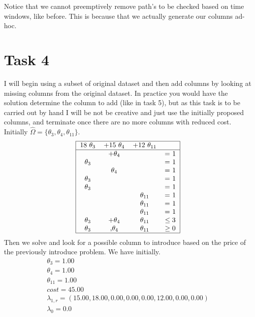 \documentclass{article}
\begin{document}
    Notice that we cannot preemptively remove path's to be checked based on time windows, like before.
    This is because that we actually generate our columns ad-hoc.

    \section{Task 4}
    I will begin using a subset of original dataset and then add columns by looking at missing columns from the original dataset.
    In practice you would have the solution determine the column to add (like in task 5), but as this task is to be carried out by hand I will be not be creative and just use the initially proposed columns, and terminate once there are no more columns with reduced cost.
    Initially $\hat{\Omega} = \{ \theta_3, \theta_4, \theta_{11} \}$.
    \[
        \begin{tabular}{ |c c c c | }
            \hline
            18 $\theta_3$ & +15 $\theta_4$ & +12 $\theta_{11}$ &\\
            \hline
            & +$\theta_4$ &          &  = 1 \\
            $\theta_3$ &  &                      &  = 1 \\
                        & $\theta_4$ &           &  = 1 \\
            $\theta_3$ &  &                      &  = 1 \\
            $\theta_3$ &  &                     &  = 1 \\
              &  &      $\theta_{11}$    &  = 1 \\
              &  &      $\theta_{11}$    &  = 1 \\
              &  &      $\theta_{11}$    &  = 1 \\
           $\theta_3$ & +$\theta_4$ & $\theta_{11}$ & $\leq 3$ \\
           $\theta_3$ & ,$\theta_4$ & $\theta_{11}$ & $\geq 0$ \\
            \hline
        \end{tabular}
    \]
    Then we solve and look for a possible column to introduce based on the price of the previously introduce problem.
    We have initially.
    \begin{equation*}
        \begin{array}{c}
            \theta_{3} = 1.00\\
            \theta_{4} = 1.00\\
            \theta_{11} = 1.00\\
            cost = 45.00\\
            \lambda_{1,r} = (15.00,18.00,0.00,0.00,0.00,12.00,0.00,0.00)\\
            \lambda_0 = 0.0
        \end{array}
    \end{equation*}
\end{document}
